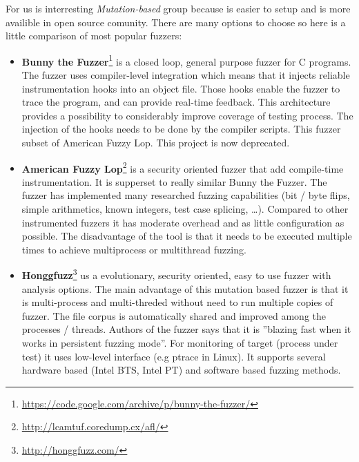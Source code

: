 For us is interresting \emph{Mutation-based} group because is easier to setup and
is more availible in open source comunity. There are many options to choose so here is
a little comparison of most popular fuzzers:

\begin{itemize}

	\item \textbf{Bunny the Fuzzer}\footnote{\url{https://code.google.com/archive/p/bunny-the-fuzzer/}} is a closed loop, general purpose fuzzer for C programs.
	The fuzzer uses compiler-level integration which means that it injects reliable instrumentation hooks into an object file.
	Those hooks enable the fuzzer to trace the program, and can provide real-time feedback. This architecture provides a possibility
	to considerably improve coverage of testing process. The injection of the hooks
	needs to be done by the compiler scripts.
	This fuzzer  subset of American Fuzzy Lop. This project is now deprecated.

	\item \textbf{American Fuzzy Lop}\footnote{\url{http://lcamtuf.coredump.cx/afl/}}
	is a security oriented fuzzer that add compile-time instrumentation. It is
	supperset to really similar Bunny the Fuzzer. The fuzzer has implemented many
	researched fuzzing capabilities (bit / byte flips,  simple arithmetics, known
	integers, test case splicing, \ldots). Compared to other instrumented fuzzers it
	has moderate overhead and as little configuration as possible. The disadvantage
	of the tool is that it needs to be executed multiple times to achieve
	multiprocess or multithread fuzzing.

	\item \textbf{Honggfuzz}\footnote{\url{http://honggfuzz.com/}} us a evolutionary, security oriented, easy to use fuzzer with analysis options.
	The main advantage of this mutation based fuzzer is that it is multi-process and multi-threded without need to run multiple copies of fuzzer.
	The file corpus is automatically shared and improved among the processes / threads.
	Authors of the fuzzer says that it is ''blazing fast when it works in persistent fuzzing mode''.
	For monitoring of target (process under test) it uses low-level interface (e.g ptrace in Linux).
	It supports several hardware based (Intel BTS, Intel PT) and software based fuzzing methods.


\end{itemize}
